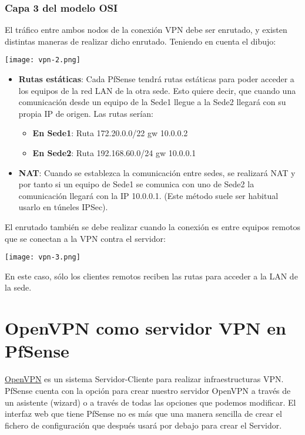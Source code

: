 \subsubsection{Capa 3 del modelo OSI}
El tráfico entre ambos nodos de la conexión VPN debe ser enrutado, y existen distintas maneras de realizar dicho enrutado. Teniendo en cuenta el dibujo:

\begin{center}
    \texttt{[image: vpn-2.png]}
\end{center}



\begin{itemize}
    \item \textbf{Rutas estáticas}: Cada PfSense tendrá rutas estáticas para poder acceder a los equipos de la red LAN de la otra sede. Esto quiere decir, que cuando una comunicación desde un equipo de la Sede1 llegue a la Sede2 llegará con su propia IP de origen. Las rutas serían:

    \begin{itemize}
        \item \textbf{En Sede1}: Ruta 172.20.0.0/22 gw 10.0.0.2
        \item \textbf{En Sede2}: Ruta 192.168.60.0/24 gw 10.0.0.1
    \end{itemize}

    \item \textbf{NAT}: Cuando se establezca la comunicación entre sedes, se realizará NAT y por tanto si un equipo de Sede1 se comunica con uno de Sede2 la comunicación llegará con la IP 10.0.0.1. (Este método suele ser habitual usarlo en túneles IPSec).
\end{itemize}


El enrutado también se debe realizar cuando la conexión es entre equipos remotos que se conectan a la VPN contra el servidor:

\begin{center}
    \texttt{[image: vpn-3.png]}
\end{center}

En este caso, sólo los clientes remotos reciben las rutas para acceder a la LAN de la sede.


\section{OpenVPN como servidor VPN en PfSense}
\href{https://openvpn.net/community/}{OpenVPN} es un sistema Servidor-Cliente para realizar infraestructuras VPN. PfSense cuenta con la opción para crear nuestro servidor OpenVPN a través de un asistente (wizard) o a través de todas las opciones que podemos modificar. El interfaz web que tiene PfSense no es más que una manera sencilla de crear el fichero de configuración que después usará por debajo para crear el Servidor.

